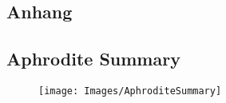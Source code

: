 \documentclass[12pt,a4paper,oneside, 
liststotoc, 					%
bibtotoc,						%
titlepage, 						%
headsepline, 					%
BCOR6mm,						%
]{scrreprt}
\begin{document}
\setcounter{secnumdepth}{3}					%
\setcounter{tocdepth}{3}
\sffamily									%



\tableofcontents							%
\printnomenclature[2.0cm]					%
\listoffigures 								%
\pagebreak
\pagestyle{fancy}					
\rmfamily





 




\newpage\newpage






\begin{appendix}
\clearpage
{}						%
\chapter{Anhang}
\section*{Aphrodite Summary}
\label{app:Aphrodite}
\begin{figure}[h]
	\centering
	\texttt{[image: Images/AphroditeSummary]}
	\label{fig:aphroditesummary}
\end{figure}

\end{appendix}
\end{document}
